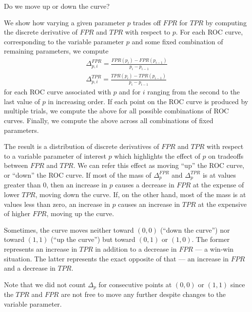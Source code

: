 Do we move up or down the curve?

We show how varying a given parameter $p$ trades off $FPR$ for $TPR$ by
computing the discrete derivative of $FPR$ and $TPR$ with respect to $p$. For
each ROC curve, corresponding to the variable parameter $p$ and some fixed
combination of remaining parameters, we compute
\begin{gather}
\Delta_{p,i}^{FPR} = \frac{FPR(p_{i}) - FPR(p_{i-1})}{p_i - p_{i-1}}\\
\Delta_{p,i}^{TPR} = \frac{TPR(p_{i}) - TPR(p_{i-1})}{p_i - p_{i-1}}
\end{gather}
for each ROC curve associated with $p$ and for $i$ ranging from the second to the last value
of $p$ in increasing order. If each point on the ROC curve is produced by
multiple trials, we compute the above for all possible combinations of ROC
curves. Finally, we compute the above across all combinations of fixed
parameters.

The result is a distribution of discrete derivatives of $FPR$ and $TPR$ with
respect to a variable parameter of interest $p$ which highlights the effect of
$p$ on tradeoffs between $FPR$ and $TPR$. We can refer this effect as moving
``up'' the ROC curve, or ``down'' the ROC curve. If most of the mass of
$\Delta_{p}^{FPR}$ and $\Delta_{p}^{TPR}$ is at values greater than 0, then an
increase in $p$ causes a decrease in $FPR$ at the expense of lower $TPR$, moving
down the curve. If, on the other hand, most of the mass is at values less than
zero, an increase in $p$ causes an increase in $TPR$ at the expensive of higher
$FPR$, moving up the curve.

Sometimes, the curve moves neither toward $(0,0)$ (``down the curve'') nor
toward $(1,1)$ (``up the curve'') but toward $(0,1)$ or $(1,0)$. The former
represents an increase in $TPR$ in addition to a decrease in $FPR$ --- a win-win
situation. The latter represents the exact opposite of that --- an increase in
$FPR$ and a decrease in $TPR$.

Note that we did not count $\Delta_p$ for consecutive points at $(0,0)$ or
$(1,1)$ since the $TPR$ and $FPR$ are not free to move any further despite
changes to the variable parameter.


